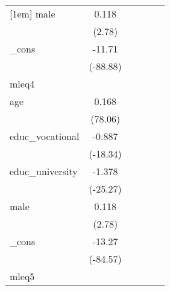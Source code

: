 {\begin{tabular}{l*{5}{c}}
[1em]
male        &       0.118\sym{**} &                     &                     &                     &                     \\
            &      (2.78)         &                     &                     &                     &                     \\
[1em]
\_cons      &      -11.71\sym{***}&                     &                     &                     &                     \\
            &    (-88.88)         &                     &                     &                     &                     \\
\hline
mleq4       &                     &                     &                     &                     &                     \\
age         &       0.168\sym{***}&                     &                     &                     &                     \\
            &     (78.06)         &                     &                     &                     &                     \\
[1em]
educ\_vocational&      -0.887\sym{***}&                     &                     &                     &                     \\
            &    (-18.34)         &                     &                     &                     &                     \\
[1em]
educ\_university&      -1.378\sym{***}&                     &                     &                     &                     \\
            &    (-25.27)         &                     &                     &                     &                     \\
[1em]
male        &       0.118\sym{**} &                     &                     &                     &                     \\
            &      (2.78)         &                     &                     &                     &                     \\
[1em]
\_cons      &      -13.27\sym{***}&                     &                     &                     &                     \\
            &    (-84.57)         &                     &                     &                     &                     \\
\hline
mleq5       &                     &                     &                     &                     &                     \\

\end{tabular}}
